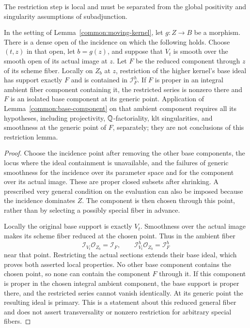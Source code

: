 The restriction step is local and must be separated from the
global positivity and singularity assumptions of subadjunction.

\begin{lemma}
\label{common:fiber-restriction}
In the setting of Lemma~\ref{common:moving-kernel}, let $g:Z\to B$
be a morphism. There is a dense open of the incidence on which
the following holds. Choose $(t,z)$ in that open, let $b=g(z)$,
and suppose that $V_t$ is smooth over the smooth open of its
actual image at $z$. Let $F$ be the reduced component through
$z$ of its scheme fiber. Locally on $Z_b$ at $z$, restriction of
the higher kernel's base ideal has support exactly $F$ and is
contained in $\mathcal I_F^h$.
If $F$ is proper in an integral ambient fiber component containing
it, the restricted series is nonzero there and $F$ is an isolated
base component at its generic point. Application of
Lemma~\ref{common:base-component} on that ambient component
requires all its hypotheses, including projectivity, $\mathbb{Q}$-factoriality,
klt singularities, and smoothness at the generic point of $F$,
separately; they are not conclusions of this restriction lemma.
\end{lemma}

\begin{proof}
Choose the incidence point after removing the other base components,
the locus where the ideal containment is unavailable, and the
failures of generic smoothness for the incidence over its parameter
space and for the component over its actual image. These are proper
closed subsets after shrinking. A prescribed very general condition
on the evaluation can also be imposed because the incidence dominates
$Z$. The component is then chosen through this point, rather than
by selecting a possibly special fiber in advance.

Locally the original base support is exactly $V_t$. Smoothness
over the actual image makes its scheme fiber reduced at the chosen
point. Thus in the ambient fiber
\[
 \mathcal I_{V_t}\mathcal O_{Z_b}=\mathcal I_F,\qquad
 \mathcal I_{V_t}^{h}\mathcal O_{Z_b}=\mathcal I_F^{h}
\]
near that point. Restricting the actual sections extends their
base ideal, which proves both asserted local properties.
No other base component contains the chosen point, so none can
contain the component $F$ through it. If this component is proper
in the chosen integral ambient component, the base support is
proper there, and the restricted series cannot vanish identically.
At its generic point the resulting ideal is primary. This is a
statement about this reduced general fiber and does not assert
transversality or nonzero restriction for arbitrary special fibers.
\end{proof}

